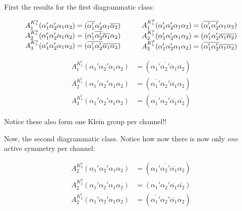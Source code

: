 \documentclass[12pt,a4paper,roman]{article}
\begin{document}
First the results for the first diagrammatic class:

\begin{align}\begin{array}{r@{\mskip\thickmuskip}l}
A_1^{K^a_1} (\alpha_1'\alpha_2'\alpha_1\alpha_2) &= (\overline{\alpha_1'}{\alpha_2'}{\alpha_1}\overline{\alpha_2})\\
A_2^{K^a_1} (\alpha_1'\alpha_2'\alpha_1\alpha_2) &= ({\alpha_1'}\overline{\alpha_2'}\overline{\alpha_1}{\alpha_2})\\
A_3^{K^a_1} (\alpha_1'\alpha_2'\alpha_1\alpha_2) &= (\overline{\alpha_1'}\overline{\alpha_2'}\overline{\alpha_1}\overline{\alpha_2})
  \end{array}
 \quad  \quad
  \begin{array}{l@{\mskip\thickmuskip}l}
A_1^{K^p_1} (\alpha_1'\alpha_2'\alpha_1\alpha_2) &= (\overline{\alpha_1'}\overline{\alpha_2'}{\alpha_1}{\alpha_2})\\
A_2^{K^p_1} (\alpha_1'\alpha_2'\alpha_1\alpha_2) &= ({\alpha_1'}{\alpha_2'}\overline{\alpha_1}\overline{\alpha_2})\\
A_3^{K^p_1} (\alpha_1'\alpha_2'\alpha_1\alpha_2) &= (\overline{\alpha_1'}\overline{\alpha_2'}\overline{\alpha_1}\overline{\alpha_2})
    \end{array}
\end{align}

\begin{align}
A_1^{K^t_1} (\alpha_1'\alpha_2'\alpha_1\alpha_2) &= ({\alpha_1'}\overline{\alpha_2'}{\alpha_1}\overline{\alpha_2})\\
A_2^{K^t_1} (\alpha_1'\alpha_2'\alpha_1\alpha_2) &= (\overline{\alpha_1'}{\alpha_2'}\overline{\alpha_1}{\alpha_2})\\
A_3^{K^t_1} (\alpha_1'\alpha_2'\alpha_1\alpha_2) &= (\overline{\alpha_1'}\overline{\alpha_2'}\overline{\alpha_1}\overline{\alpha_2})
\end{align}

Notice these also form one Klein group per channel!!

Now, the second diagrammatic class. Notice how now there is now only \textit{one} active symmetry per channel:

\begin{align}
A_2^{K^a_2} (\alpha_1'\alpha_2'\alpha_1\alpha_2) &= ({\alpha_1'}\overline{\alpha_2'}\overline{\alpha_1}{\alpha_2})\\
A_2^{K^p_2} (\alpha_1'\alpha_2'\alpha_1\alpha_2) &= ({\alpha_1'}{\alpha_2'}\overline{\alpha_1}\overline{\alpha_2})\\
A_2^{K^t_2} (\alpha_1'\alpha_2'\alpha_1\alpha_2) &= (\overline{\alpha_1'}{\alpha_2'}\overline{\alpha_1}{\alpha_2})\\
\end{align}
\end{document}
